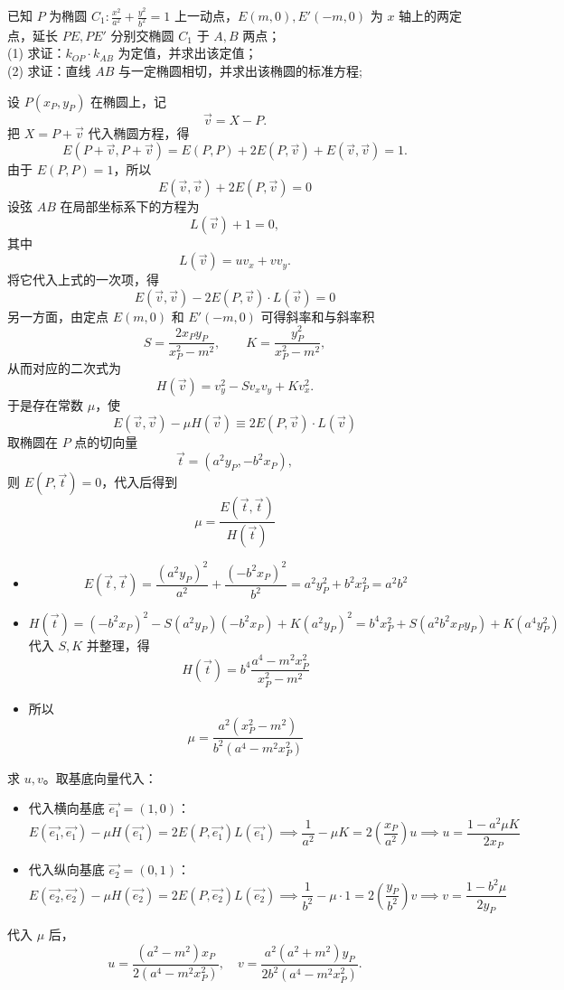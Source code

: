 \begin{exercise}
已知 $P$ 为椭圆 $C_1: \frac{x^2}{a^2} + \frac{y^2}{b^2} = 1$ 上一动点，$E(m,0), E'(-m,0)$ 为 $x$ 轴上的两定点，延长 $PE, PE'$ 分别交椭圆 $C_1$ 于 $A, B$ 两点；\\
(1) 求证：$k_{OP} \cdot k_{AB}$ 为定值，并求出该定值；\\
(2) 求证：直线 $AB$ 与一定椭圆相切，并求出该椭圆的标准方程;
\end{exercise}
\begin{solution}
设 $P(x_P,y_P)$ 在椭圆上，记
$$\vec{v} = X - P.$$
把 $X=P+\vec{v}$ 代入椭圆方程，得
$$E(P+\vec{v}, P+\vec{v}) = E(P,P) + 2E(P, \vec{v}) + E(\vec{v}, \vec{v}) = 1.$$
由于 $E(P,P)=1$，所以
$$E(\vec{v}, \vec{v}) + 2E(P, \vec{v}) = 0$$
设弦 $AB$ 在局部坐标系下的方程为
$$L(\vec{v}) + 1 = 0,$$
其中
$$L(\vec{v}) = u v_x + v v_y.$$
将它代入上式的一次项，得
$$E(\vec{v}, \vec{v}) - 2E(P, \vec{v}) \cdot L(\vec{v}) = 0$$
另一方面，由定点 $E(m,0)$ 和 $E'(-m,0)$ 可得斜率和与斜率积
$$S = \frac{2x_P y_P}{x_P^2-m^2},\qquad K = \frac{y_P^2}{x_P^2-m^2},$$
从而对应的二次式为
$$H(\vec{v}) = v_y^2 - S v_x v_y + K v_x^2.$$
于是存在常数 $\mu$，使
$$E(\vec{v}, \vec{v}) - \mu H(\vec{v}) \equiv 2E(P, \vec{v}) \cdot L(\vec{v})$$
取椭圆在 $P$ 点的切向量
$$\vec{t} = (a^2 y_P, -b^2 x_P),$$
则 $E(P,\vec{t})=0$，代入后得到
$$\mu = \frac{E(\vec{t}, \vec{t})}{H(\vec{t})}$$
\begin{itemize}
\item \[E(\vec{t}, \vec{t}) = \frac{(a^2 y_P)^2}{a^2} + \frac{(-b^2 x_P)^2}{b^2} = a^2 y_P^2 + b^2 x_P^2 = a^2 b^2\]
\item \[H(\vec{t}) = (-b^2 x_P)^2 - S(a^2 y_P)(-b^2 x_P) + K(a^2 y_P)^2 = b^4 x_P^2 + S(a^2 b^2 x_P y_P) + K(a^4 y_P^2)\]
代入 $S,K$ 并整理，得
$$H(\vec{t}) = b^4 \frac{a^4 - m^2 x_P^2}{x_P^2 - m^2}$$
\item 所以
$$\mu = \frac{a^2(x_P^2 - m^2)}{b^2(a^4 - m^2 x_P^2)}$$
\end{itemize}
求 $u,v$。取基底向量代入：
\begin{itemize}
\item 代入横向基底 $\vec{e_1} = (1,0)$：\[E(\vec{e_1}, \vec{e_1}) - \mu H(\vec{e_1}) = 2E(P, \vec{e_1}) L(\vec{e_1}) \implies \frac{1}{a^2} - \mu K = 2\left(\frac{x_P}{a^2}\right) u \implies u = \frac{1 - a^2 \mu K}{2x_P}\]
\item 代入纵向基底 $\vec{e_2} = (0,1)$：\[E(\vec{e_2}, \vec{e_2}) - \mu H(\vec{e_2}) = 2E(P, \vec{e_2}) L(\vec{e_2}) \implies \frac{1}{b^2} - \mu \cdot 1 = 2\left(\frac{y_P}{b^2}\right) v \implies v = \frac{1 - b^2 \mu}{2y_P}\]
\end{itemize}
代入 $\mu$ 后，
$$u = \frac{(a^2 - m^2)x_P}{2(a^4 - m^2 x_P^2)}, \quad v = \frac{a^2(a^2 + m^2)y_P}{2b^2(a^4 - m^2 x_P^2)}.$$


\end{solution}
